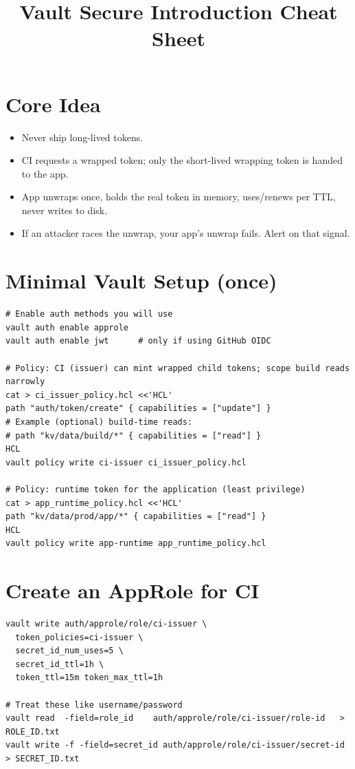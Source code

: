 \documentclass[11pt,letterpaper]{article}
\title{Vault Secure Introduction Cheat Sheet}
\author{}
\date{}
\begin{document}
\maketitle
\vspace{-1.25em}

\section*{Core Idea}
\begin{itemize}[leftmargin=1.25em]
  \item Never ship long-lived tokens.
  \item CI requests a wrapped token; only the short-lived wrapping token is handed to the app.
  \item App unwraps once, holds the real token in memory, uses/renews per TTL, never writes to disk.
  \item If an attacker races the unwrap, your app's unwrap fails. Alert on that signal.
\end{itemize}

\section*{Minimal Vault Setup (once)}
\begin{verbatim}
# Enable auth methods you will use
vault auth enable approle
vault auth enable jwt      # only if using GitHub OIDC

# Policy: CI (issuer) can mint wrapped child tokens; scope build reads narrowly
cat > ci_issuer_policy.hcl <<'HCL'
path "auth/token/create" { capabilities = ["update"] }
# Example (optional) build-time reads:
# path "kv/data/build/*" { capabilities = ["read"] }
HCL
vault policy write ci-issuer ci_issuer_policy.hcl

# Policy: runtime token for the application (least privilege)
cat > app_runtime_policy.hcl <<'HCL'
path "kv/data/prod/app/*" { capabilities = ["read"] }
HCL
vault policy write app-runtime app_runtime_policy.hcl
\end{verbatim}

\section*{Create an AppRole for CI}
\begin{verbatim}
vault write auth/approle/role/ci-issuer \
  token_policies=ci-issuer \
  secret_id_num_uses=5 \
  secret_id_ttl=1h \
  token_ttl=15m token_max_ttl=1h

# Treat these like username/password
vault read  -field=role_id    auth/approle/role/ci-issuer/role-id   > ROLE_ID.txt
vault write -f -field=secret_id auth/approle/role/ci-issuer/secret-id > SECRET_ID.txt
\end{verbatim}
\end{document}
